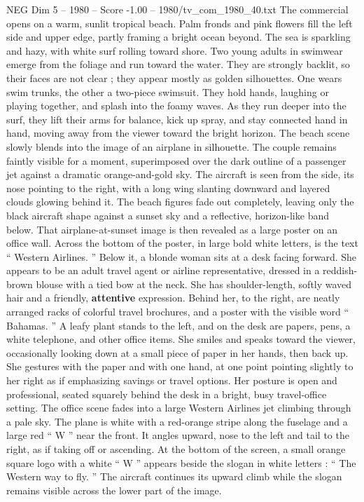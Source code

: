 \begin{textsample}{NEG Dim 5 – 1980 – Score -1.00 – 1980/tv\_com\_1980\_40.txt}  \label{ex:f5_neg_066}
The commercial opens on a warm, sunlit tropical beach.
Palm fronds and pink flowers fill the left side and upper edge, partly framing a bright ocean beyond.
The sea is sparkling and hazy, with white surf rolling toward shore.
Two young adults in swimwear emerge from the foliage and run toward the water.
They are strongly backlit, so their faces are not clear ; they appear mostly as golden silhouettes.
One wears swim trunks, the other a two-piece swimsuit.
They hold hands, laughing or playing together, and splash into the foamy waves.
As they run deeper into the surf, they lift their arms for balance, kick up spray, and stay connected hand in hand, moving away from the viewer toward the bright horizon.
The beach scene slowly blends into the image of an airplane in silhouette.
The couple remains faintly visible for a moment, superimposed over the dark outline of a passenger jet against a dramatic orange-and-gold sky.
The aircraft is seen from the side, its nose pointing to the right, with a long wing slanting downward and layered clouds glowing behind it.
The beach figures fade out completely, leaving only the black aircraft shape against a sunset sky and a reflective, horizon-like band below.
That airplane-at-sunset image is then revealed as a large poster on an office wall.
Across the bottom of the poster, in large bold white letters, is the text “ Western Airlines. ” Below it, a blonde woman sits at a desk facing forward.
She appears to be an adult travel agent or airline representative, dressed in a reddish-brown blouse with a tied bow at the neck.
She has shoulder-length, softly waved hair and a friendly, \textbf{attentive} expression.
Behind her, to the right, are neatly arranged racks of colorful travel brochures, and a poster with the visible word “ Bahamas. ” A leafy plant stands to the left, and on the desk are papers, pens, a white telephone, and other office items.
She smiles and speaks toward the viewer, occasionally looking down at a small piece of paper in her hands, then back up.
She gestures with the paper and with one hand, at one point pointing slightly to her right as if emphasizing savings or travel options.
Her posture is open and professional, seated squarely behind the desk in a bright, busy travel-office setting.
The office scene fades into a large Western Airlines jet climbing through a pale sky.
The plane is white with a red-orange stripe along the fuselage and a large red “ W ” near the front.
It angles upward, nose to the left and tail to the right, as if taking off or ascending.
At the bottom of the screen, a small orange square logo with a white “ W ” appears beside the slogan in white letters : “ The Western way to fly. ” The aircraft continues its upward climb while the slogan remains visible across the lower part of the image.

\end{textsample}
